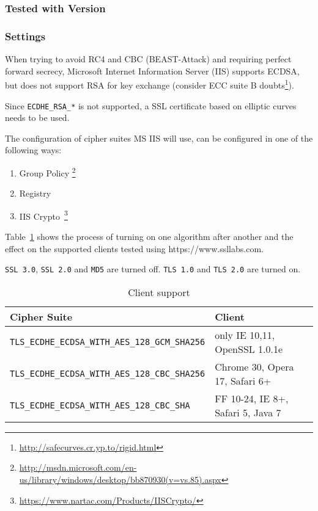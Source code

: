 

\subsubsection{Tested with Version} 

\subsubsection{Settings}


When trying to avoid RC4 and CBC (BEAST-Attack) and requiring perfect
forward secrecy, Microsoft Internet Information Server (IIS) supports
ECDSA, but does not support RSA for key exchange (consider ECC suite
B doubts\footnote{\url{http://safecurves.cr.yp.to/rigid.html}}).

Since \verb|ECDHE_RSA_*| is not supported, a SSL certificate based on
elliptic curves needs to be used.

The configuration of cipher suites MS IIS will use, can be configured in one
of the following ways:
\begin{enumerate}
\item Group Policy \footnote{\url{http://msdn.microsoft.com/en-us/library/windows/desktop/bb870930(v=vs.85).aspx}}
\item Registry
\item IIS Crypto~\footnote{\url{https://www.nartac.com/Products/IISCrypto/}}
\end{enumerate}


Table~\ref{tab:MS_IIS_Client_Support} shows the process of turning on
one algorithm after another and the effect on the supported clients
tested using https://www.ssllabs.com.

\verb|SSL 3.0|, \verb|SSL 2.0| and \verb|MD5| are turned off.
\verb|TLS 1.0| and \verb|TLS 2.0| are turned on.

\begin{table}[h]
  \centering
  \small
  \begin{tabular}{ll}
    \toprule
    Cipher Suite & Client \\
    \midrule
    \verb|TLS_ECDHE_ECDSA_WITH_AES_128_GCM_SHA256| & only IE 10,11, OpenSSL 1.0.1e \\
    \verb|TLS_ECDHE_ECDSA_WITH_AES_128_CBC_SHA256| & Chrome 30, Opera 17, Safari 6+ \\
    \verb|TLS_ECDHE_ECDSA_WITH_AES_128_CBC_SHA| & FF 10-24, IE 8+, Safari 5, Java 7\\
    \bottomrule 
 \end{tabular}
  \caption{Client support}
  \label{tab:MS_IIS_Client_Support}
\end{table}

